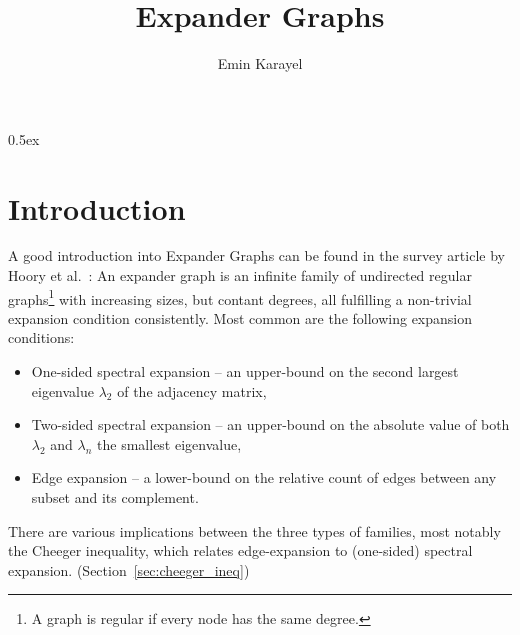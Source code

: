 \documentclass[11pt,a4paper]{article}
\begin{document}
\title{Expander Graphs}
\author{Emin Karayel}
\maketitle


\tableofcontents

\parindent 0pt\parskip 0.5ex
\pagebreak

\section{Introduction}
A good introduction into Expander Graphs can be found in the survey article by 
Hoory et al.~\cite{hoory2006}: An expander graph is an infinite family of undirected regular 
graphs\footnote{A graph is regular if every node has the same degree.}  
with increasing sizes, but contant degrees, all fulfilling a non-trivial expansion condition 
consistently. Most common are the following expansion conditions:
\begin{itemize}
\item One-sided spectral expansion -- an upper-bound on the second largest 
  eigenvalue $\lambda_2$ of the adjacency matrix,
\item Two-sided spectral expansion -- an upper-bound on the absolute value of both 
  $\lambda_2$ and $\lambda_n$ the smallest eigenvalue,
\item Edge expansion -- a lower-bound on the relative count of edges between any subset
  and its complement.
\end{itemize}

There are various implications between the three types of families, most notably the Cheeger 
inequality, which relates edge-expansion to (one-sided) spectral expansion. 
(Section~\ref{sec:cheeger_ineq})
\end{document}
